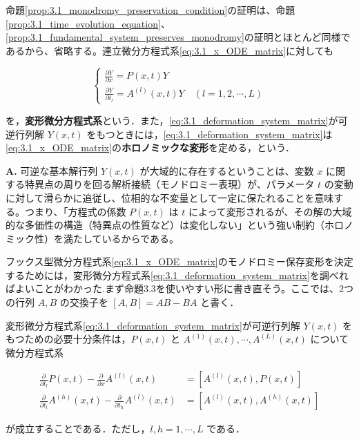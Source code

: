 命題\ref{prop:3.1_monodromy_preservation_condition}の証明は、命題\ref{prop:3.1_time_evolution_equation}、\ref{prop:3.1_fundamental_system_preserves_monodromy}の証明とほとんど同様であるから、省略する。連立微分方程式系\eqref{eq:3.1_x_ODE_matrix}に対しても

\begin{equation}\label{eq:3.1_deformation_system_matrix}
  \begin{cases}
    \displaystyle \frac{\partial Y}{\partial x} = P(x,t)Y \\[4mm]
    \displaystyle \frac{\partial Y}{\partial t_l} = A^{(l)}(x,t)Y \quad (l=1,2,\cdots,L)
  \end{cases}
\end{equation}

を，\textbf{変形微分方程式系}という．また，\eqref{eq:3.1_deformation_system_matrix}が可逆行列解 $Y(x,t)$ をもつときには，\eqref{eq:3.1_deformation_system_matrix}は\eqref{eq:3.1_x_ODE_matrix}の\textbf{ホロノミックな変形}を定める，という．

\begin{Q}
\textbf{A.} 可逆な基本解行列 $Y(x,t)$ が大域的に存在するということは、変数 $x$ に関する特異点の周りを回る解析接続（モノドロミー表現）が、パラメータ $t$ の変動に対して滑らかに追従し、位相的な不変量として一定に保たれることを意味する。つまり、「方程式の係数 $P(x,t)$ は $t$ によって変形されるが、その解の大域的な多価性の構造（特異点の性質など）は変化しない」という強い制約（ホロノミック性）を満たしているからである。
\end{Q}

フックス型微分方程式系\eqref{eq:3.1_x_ODE_matrix}のモノドロミー保存変形を決定するためには，変形微分方程式系\eqref{eq:3.1_deformation_system_matrix}を調べればよいことがわかった.まず命題3.3を使いやすい形に書き直そう。ここでは、2つの行列 $A, B$ の交換子を $[A, B] = AB - BA$ と書く．

\begin{proposition}\label{prop:3.1_compatibility}
変形微分方程式系\eqref{eq:3.1_deformation_system_matrix}が可逆行列解 $Y(x,t)$ をもつための必要十分条件は，$P(x,t)$ と $A^{(1)}(x,t), \cdots, A^{(L)}(x,t)$ について微分方程式系

\begin{align}
  \frac{\partial}{\partial t_l}P(x,t) - \frac{\partial}{\partial x}A^{(l)}(x,t) &= \left[ A^{(l)}(x,t), P(x,t) \right] \label{eq:3.1_compatibility_PA}\\
  \frac{\partial}{\partial t_l}A^{(h)}(x,t) - \frac{\partial}{\partial t_h}A^{(l)}(x,t) &= \left[ A^{(l)}(x,t), A^{(h)}(x,t) \right] \label{eq:3.1_compatibility_AA}
\end{align}

が成立することである．ただし，$l,h=1,\cdots,L$ である．
\end{proposition}

